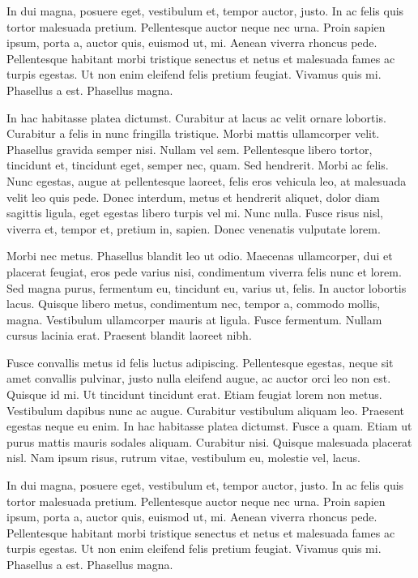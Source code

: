 \begin{multicols}{2}
In dui magna, posuere eget, vestibulum et, tempor auctor, justo. In ac
felis quis tortor malesuada pretium. Pellentesque auctor neque nec
urna. Proin sapien ipsum, porta a, auctor quis, euismod ut, mi. Aenean
viverra rhoncus pede. Pellentesque habitant morbi tristique senectus
et netus et malesuada fames ac turpis egestas. Ut non enim eleifend
felis pretium feugiat. Vivamus quis mi. Phasellus a est. Phasellus
magna.

In hac habitasse platea dictumst. Curabitur at lacus ac velit ornare
lobortis. Curabitur a felis in nunc fringilla tristique. Morbi mattis
ullamcorper velit. Phasellus gravida semper nisi. Nullam vel sem.
Pellentesque libero tortor, tincidunt et, tincidunt eget, semper nec,
quam. Sed hendrerit. Morbi ac felis. Nunc egestas, augue at
pellentesque laoreet, felis eros vehicula leo, at malesuada velit leo
quis pede. Donec interdum, metus et hendrerit aliquet, dolor diam
sagittis ligula, eget egestas libero turpis vel mi. Nunc nulla. Fusce
risus nisl, viverra et, tempor et, pretium in, sapien. Donec venenatis
vulputate lorem.

Morbi nec metus. Phasellus blandit leo ut odio. Maecenas ullamcorper,
dui et placerat feugiat, eros pede varius nisi, condimentum viverra
felis nunc et lorem. Sed magna purus, fermentum eu, tincidunt eu,
varius ut, felis. In auctor lobortis lacus. Quisque libero metus,
condimentum nec, tempor a, commodo mollis, magna. Vestibulum
ullamcorper mauris at ligula. Fusce fermentum. Nullam cursus lacinia
erat. Praesent blandit laoreet nibh.

Fusce convallis metus id felis luctus adipiscing. Pellentesque
egestas, neque sit amet convallis pulvinar, justo nulla eleifend
augue, ac auctor orci leo non est. Quisque id mi. Ut tincidunt
tincidunt erat. Etiam feugiat lorem non metus. Vestibulum dapibus nunc
ac augue. Curabitur vestibulum aliquam leo. Praesent egestas neque eu
enim. In hac habitasse platea dictumst. Fusce a quam. Etiam ut purus
mattis mauris sodales aliquam. Curabitur nisi. Quisque malesuada
placerat nisl. Nam ipsum risus, rutrum vitae, vestibulum eu, molestie
vel, lacus.

In dui magna, posuere eget, vestibulum et, tempor auctor, justo. In ac
felis quis tortor malesuada pretium. Pellentesque auctor neque nec
urna. Proin sapien ipsum, porta a, auctor quis, euismod ut, mi. Aenean
viverra rhoncus pede. Pellentesque habitant morbi tristique senectus
et netus et malesuada fames ac turpis egestas. Ut non enim eleifend
felis pretium feugiat. Vivamus quis mi. Phasellus a est. Phasellus
magna.


\end{multicols}
